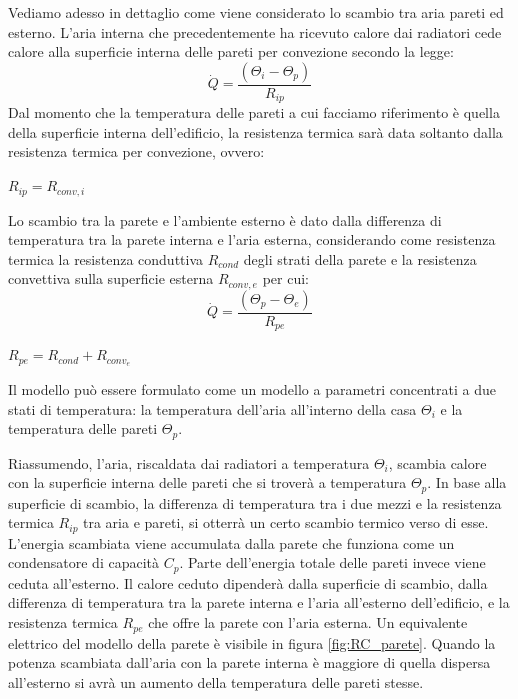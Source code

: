 \documentclass[laurea,oneside,11pt]{USiena_tesiLM}
\begin{document}
Vediamo adesso in dettaglio come viene considerato lo scambio tra aria pareti ed esterno. L'aria interna che precedentemente ha ricevuto calore dai radiatori cede calore alla superficie interna delle pareti per convezione secondo la legge:
\begin{equation}
\dot{Q} = \frac{(\Theta_i - \Theta_p)}{R_{ip}} 
\end{equation} 
Dal momento che la temperatura delle pareti a cui facciamo riferimento è quella della superficie interna dell'edificio, la resistenza termica sarà data soltanto dalla resistenza termica per convezione, ovvero:
\begin{center}
$R_{ip} = R_{conv,i}$
\end{center}

Lo scambio tra la parete e l'ambiente esterno è dato dalla differenza di temperatura tra la parete interna e l'aria  esterna, considerando come resistenza termica la resistenza conduttiva $R_{cond}$ degli strati della parete e la resistenza convettiva sulla superficie esterna $R_{conv,e}$ per cui:
\begin{equation}
\dot{Q} = \frac{(\Theta_p - \Theta_e)}{R_{pe}} 
\end{equation} 
\begin{center}
$R_{pe} = R_{cond} + R_{conv_e}$
\end{center}

Il modello può essere formulato come un modello a parametri concentrati a due stati di temperatura: la temperatura dell'aria all'interno della casa $\Theta_i$ e la temperatura delle pareti $\Theta_p$.

Riassumendo, l'aria, riscaldata dai radiatori a temperatura $\Theta_i$, scambia calore con la superficie interna delle pareti che si troverà a temperatura $\Theta_p$. In base alla superficie di scambio, la differenza di temperatura tra i due mezzi e la resistenza termica $R_{ip}$ tra aria e pareti, si otterrà un certo scambio termico verso di esse. L'energia scambiata viene accumulata dalla parete che funziona come un condensatore di capacità $C_p$. Parte dell'energia totale delle pareti invece viene ceduta all'esterno. Il calore ceduto dipenderà dalla superficie di scambio, dalla differenza di temperatura tra la parete interna e l'aria all'esterno dell'edificio, e la resistenza termica $R_{pe}$ che offre la parete con l'aria esterna.  Un equivalente elettrico del modello della parete è visibile in figura \ref{fig:RC_parete}.
Quando la potenza scambiata dall'aria con la parete  interna è maggiore di quella dispersa all'esterno si avrà un aumento della temperatura delle pareti stesse.
\end{document}
